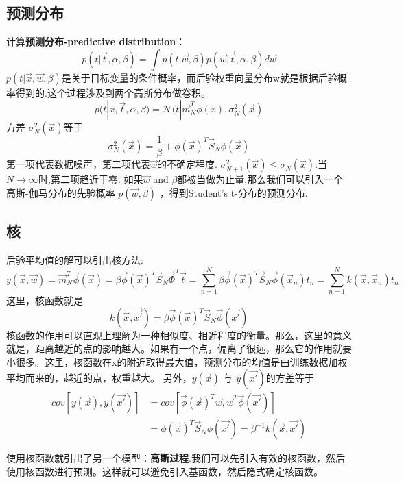 \documentclass[a4paper]{article}
\begin{document}
\subsection{预测分布}
计算\textbf{预测分布-predictive distribution}：
\begin{equation}
p(t|\vec{t},\alpha,\beta) = \int p(t|\vec{w},\beta)p(\vec{w}|\vec{t},\alpha,\beta)d\vec{w}
\end{equation}
$p(t|\vec{x},\vec{w},\beta)$是关于目标变量的条件概率，而后验权重向量分布w就是根据后验概率得到的.这个过程涉及到两个高斯分布做卷积。
\begin{equation}
p(t|x,\vec{t},\alpha,\beta) = \mathcal{N}(t|\vec{m}_N^T\phi(x),\sigma_N^2(\vec{x})
\end{equation}
方差 $\sigma_N^2(\vec{x})$等于
\begin{equation}
\sigma_N^2(\vec{x})=\dfrac{1}{\beta}+\phi(\vec{x})^T\vec{S}_N\phi(\vec{x})
\end{equation}
第一项代表数据噪声，第二项代表$\vec{w}$的不确定程度.
$\sigma_{N+1}^2(\vec{x})\leq \sigma_N(\vec{x})$.当$N\rightarrow \infty$时,第二项趋近于零.
如果$\vec{w}$ and $\beta$都被当做为止量,那么我们可以引入一个高斯-伽马分布的先验概率 $p(\vec{w},\beta)$ ，得到Student's t-分布的预测分布.

\subsection{核}
后验平均值的解可以引出核方法:
\begin{equation}
y(\vec{x},\vec{w})=\vec{m}_N^T\vec{\phi}(\vec{x})
=\beta\vec{\phi}(\vec{x})^T\vec{S}_N\vec{\Phi}^T\vec{t}
=\sum_{n=1}^{N}\beta\vec{\phi}(\vec{x})^T\vec{S}_N\vec{\phi}(\vec{x}_n)t_n
=\sum_{n=1}^{N}\mathit{k}(\vec{x},\vec{x}_n)t_n
\end{equation}
这里，核函数就是
\begin{equation}
k(\vec{x},\vec{x'})
=\beta\vec{\phi}(\vec{x})^T\vec{S}_N\vec{\phi}(\vec{x'})
\end{equation}
核函数的作用可以直观上理解为一种相似度、相近程度的衡量。那么，这里的意义就是，距离越近的点的影响越大。如果有一个点，偏离了很远，那么它的作用就要小很多。这里，核函数在x的附近取得最大值，预测分布的均值是由训练数据加权平均而来的，越近的点，权重越大。
另外，$y(\vec{x})$ 与 $y(\vec{x'})$的方差等于
\begin{align}
cov[y(\vec{x}),y(\vec{x'})] &=cov[\vec{\phi}(\vec{x})^T\vec{w},\vec{w}^T\vec{\phi}(\vec{x'})] \\
&=\phi(\vec{x})^T\vec{S}_N\phi(\vec{x'})=\beta^{-1}\mathit{k}(\vec{x},\vec{x'})
\end{align}

使用核函数就引出了另一个模型：\textbf{高斯过程}.我们可以先引入有效的核函数，然后使用核函数进行预测。这样就可以避免引入基函数，然后隐式确定核函数。
\end{document}
